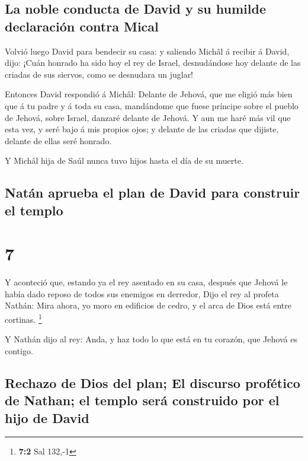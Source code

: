 \hypertarget{la-noble-conducta-de-david-y-su-humilde-declaraciuxf3n-contra-mical}{%
\subsection{La noble conducta de David y su humilde declaración contra
Mical}\label{la-noble-conducta-de-david-y-su-humilde-declaraciuxf3n-contra-mical}}

 Volvió luego David para bendecir su casa: y saliendo
Michâl á recibir á David, dijo: ¡Cuán honrado ha sido hoy el rey de
Israel, desnudándose hoy delante de las criadas de sus siervos, como se
desnudara un juglar!

 Entonces David respondió á Michâl: Delante de Jehová,
que me eligió más bien que á tu padre y á toda su casa, mandándome que
fuese príncipe sobre el pueblo de Jehová, sobre Israel, danzaré delante
de Jehová.  Y aun me haré más vil que esta vez, y seré
bajo á mis propios ojos; y delante de las criadas que dijiste, delante
de ellas seré honrado.

 Y Michâl hija de Saúl nunca tuvo hijos hasta el día de
su muerte.

\hypertarget{natuxe1n-aprueba-el-plan-de-david-para-construir-el-templo}{%
\subsection{Natán aprueba el plan de David para construir el
templo}\label{natuxe1n-aprueba-el-plan-de-david-para-construir-el-templo}}

\hypertarget{section-6}{%
\section{7}\label{section-6}}

 Y aconteció que, estando ya el rey asentado en su casa,
después que Jehová le había dado reposo de todos sus enemigos en
derredor,  Dijo el rey al profeta Nathán: Mira ahora, yo
moro en edificios de cedro, y el arca de Dios está entre cortinas.
\footnote{\textbf{7:2} Sal 132,-1}

 Y Nathán dijo al rey: Anda, y haz todo lo que está en tu
corazón, que Jehová es contigo.

\hypertarget{rechazo-de-dios-del-plan-el-discurso-profuxe9tico-de-nathan-el-templo-seruxe1-construido-por-el-hijo-de-david}{%
\subsection{Rechazo de Dios del plan; El discurso profético de Nathan;
el templo será construido por el hijo de
David}\label{rechazo-de-dios-del-plan-el-discurso-profuxe9tico-de-nathan-el-templo-seruxe1-construido-por-el-hijo-de-david}}

